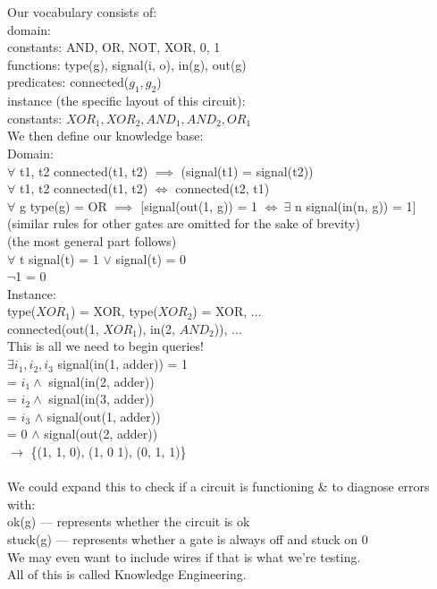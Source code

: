 \documentclass[../../lecture_notes.tex]{subfiles}
\begin{document}
\noindent Our vocabulary consists of:\\
	\indent domain:\\
	\indent \indent constants: {AND, OR, NOT, XOR, 0, 1}\\
	\indent \indent functions: {type(g), signal(i, o), in(g), out(g)}\\
	\indent \indent predicates: {connected($g_1, g_2$)}\\
	\indent instance (the specific layout of this circuit):\\
	\indent \indent constants: {$XOR_1, XOR_2, AND_1, AND_2, OR_1$}\\
We then define our knowledge base:\\
	\indent Domain:\\
	\indent \indent $\forall$ t1, t2 connected(t1, t2) $\implies$ (signal(t1) = signal(t2))\\
	\indent \indent $\forall$ t1, t2 connected(t1, t2) $\iff$ connected(t2, t1)\\
	\indent \indent $\forall$ g type(g) = OR $\implies$ [signal(out(1, g)) = 1 $\iff \ \exists$ n signal(in(n, g)) = 1]\\
	\indent \indent \indent (similar rules for other gates are omitted for the sake of brevity)\\
	\indent \indent (the most general part follows)\\
	\indent \indent $\forall$ t signal(t) = 1 $\lor$ signal(t) = 0\\
	\indent \indent $\neg$1 = 0\\
	\indent Instance:\\
	\indent \indent type($XOR_1$) = XOR, type($XOR_2$) = XOR, ...\\
	\indent \indent connected(out(1, $XOR_1$), in(2, $AND_2$)), ...\\
This is all we need to begin queries!\\
	\indent $\exists i_1, i_2, i_3$ signal(in(1, adder)) = 1\\
		\indent \indent = $i_1 \land$ signal(in(2, adder)) \\
		\indent \indent = $i_2 \land$ signal(in(3, adder)) \\
		\indent \indent = $i_3$ $\land$ signal(out(1, adder)) \\
		\indent \indent = 0 $\land$ signal(out(2, adder)) \\
	\indent $\rightarrow$ \{(1, 1, 0), (1, 0 1), (0, 1, 1)\}\\
\\
We could expand this to check if a circuit is functioning \& to diagnose errors with:\\
	\indent ok(g) — represents whether the circuit is ok\\
	\indent stuck(g) — represents whether a gate is always off and stuck on 0\\
We may even want to include wires if that is what we’re testing.\\
All of this is called Knowledge Engineering.
\end{document}
